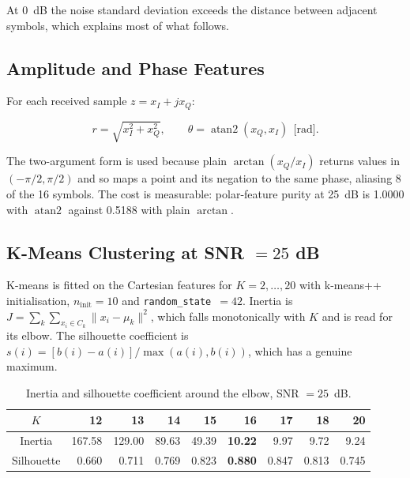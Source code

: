 \documentclass[11pt,a4paper]{article}
\begin{document}
At 0~dB the noise standard deviation exceeds the distance between adjacent symbols, which
explains most of what follows.

\subsection{Amplitude and Phase Features}

For each received sample $z = x_I + jx_Q$:

\begin{equation}
r = \sqrt{x_I^2 + x_Q^2},
\qquad
\theta = \operatorname{atan2}(x_Q, x_I) \ \ \text{[rad]}.
\end{equation}

The two-argument form is used because plain $\arctan(x_Q/x_I)$ returns values in
$(-\pi/2,\pi/2)$ and so maps a point and its negation to the same phase, aliasing 8 of the 16
symbols. The cost is measurable: polar-feature purity at 25~dB is 1.0000 with
$\operatorname{atan2}$ against 0.5188 with plain $\arctan$.

\subsection{K-Means Clustering at SNR $=25$ dB}

K-means is fitted on the Cartesian features for $K = 2,\dots,20$ with k-means++ initialisation,
$n_{\mathrm{init}} = 10$ and \texttt{random\_state}~$=42$. Inertia is
$J = \sum_k \sum_{x_i \in C_k} \lVert x_i - \mu_k \rVert^2$, which falls monotonically with $K$
and is read for its elbow. The silhouette coefficient is
$s(i) = [b(i) - a(i)] / \max(a(i), b(i))$, which has a genuine maximum.

\begin{table}[H]
\centering
\caption{Inertia and silhouette coefficient around the elbow, SNR $= 25$~dB.}
\label{tab:ksweep}
\begin{tabular}{crrrrrrrr}
\toprule
$K$ & 12 & 13 & 14 & 15 & \textbf{16} & 17 & 18 & 20 \\
\midrule
Inertia    & 167.58 & 129.00 & 89.63 & 49.39 & \textbf{10.22} & 9.97 & 9.72 & 9.24 \\
Silhouette & 0.660 & 0.711 & 0.769 & 0.823 & \textbf{0.880} & 0.847 & 0.813 & 0.745 \\
\bottomrule
\end{tabular}
\end{table}
\end{document}
